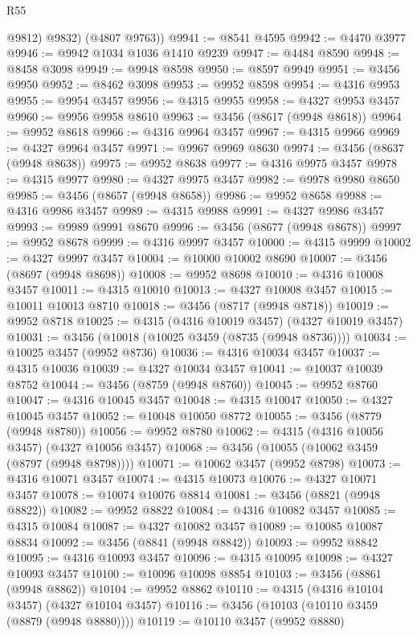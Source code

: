 \begin{lexlean}{R55}
\begin{coremodule}
          @9812)
        @9832)
      (@4807 @9763))
@9941 := @8541 @4595
@9942 := @4470 @3977
@9946 := @9942 @1034 @1036 @1410 @9239
@9947 := @4484 @8590
@9948 := @8458 @3098
@9949 := @9948 @8598
@9950 := @8597 @9949
@9951 := @3456 @9950
@9952 := @8462 @3098
@9953 := @9952 @8598
@9954 := @4316 @9953
@9955 := @9954 @3457
@9956 := @4315 @9955
@9958 := @4327 @9953 @3457
@9960 := @9956 @9958 @8610
@9963 := @3456 (@8617 (@9948 @8618))
@9964 := @9952 @8618
@9966 := @4316 @9964 @3457
@9967 := @4315 @9966
@9969 := @4327 @9964 @3457
@9971 := @9967 @9969 @8630
@9974 := @3456 (@8637 (@9948 @8638))
@9975 := @9952 @8638
@9977 := @4316 @9975 @3457
@9978 := @4315 @9977
@9980 := @4327 @9975 @3457
@9982 := @9978 @9980 @8650
@9985 := @3456 (@8657 (@9948 @8658))
@9986 := @9952 @8658
@9988 := @4316 @9986 @3457
@9989 := @4315 @9988
@9991 := @4327 @9986 @3457
@9993 := @9989 @9991 @8670
@9996 := @3456 (@8677 (@9948 @8678))
@9997 := @9952 @8678
@9999 := @4316 @9997 @3457
@10000 := @4315 @9999
@10002 := @4327 @9997 @3457
@10004 := @10000 @10002 @8690
@10007 := @3456 (@8697 (@9948 @8698))
@10008 := @9952 @8698
@10010 := @4316 @10008 @3457
@10011 := @4315 @10010
@10013 := @4327 @10008 @3457
@10015 := @10011 @10013 @8710
@10018 := @3456 (@8717 (@9948 @8718))
@10019 := @9952 @8718
@10025 := @4315 (@4316 @10019 @3457) (@4327 @10019 @3457)
@10031 := @3456 (@10018 (@10025 @3459 (@8735 (@9948 @8736))))
@10034 := @10025 @3457 (@9952 @8736)
@10036 := @4316 @10034 @3457
@10037 := @4315 @10036
@10039 := @4327 @10034 @3457
@10041 := @10037 @10039 @8752
@10044 := @3456 (@8759 (@9948 @8760))
@10045 := @9952 @8760
@10047 := @4316 @10045 @3457
@10048 := @4315 @10047
@10050 := @4327 @10045 @3457
@10052 := @10048 @10050 @8772
@10055 := @3456 (@8779 (@9948 @8780))
@10056 := @9952 @8780
@10062 := @4315 (@4316 @10056 @3457) (@4327 @10056 @3457)
@10068 := @3456 (@10055 (@10062 @3459 (@8797 (@9948 @8798))))
@10071 := @10062 @3457 (@9952 @8798)
@10073 := @4316 @10071 @3457
@10074 := @4315 @10073
@10076 := @4327 @10071 @3457
@10078 := @10074 @10076 @8814
@10081 := @3456 (@8821 (@9948 @8822))
@10082 := @9952 @8822
@10084 := @4316 @10082 @3457
@10085 := @4315 @10084
@10087 := @4327 @10082 @3457
@10089 := @10085 @10087 @8834
@10092 := @3456 (@8841 (@9948 @8842))
@10093 := @9952 @8842
@10095 := @4316 @10093 @3457
@10096 := @4315 @10095
@10098 := @4327 @10093 @3457
@10100 := @10096 @10098 @8854
@10103 := @3456 (@8861 (@9948 @8862))
@10104 := @9952 @8862
@10110 := @4315 (@4316 @10104 @3457) (@4327 @10104 @3457)
@10116 := @3456 (@10103 (@10110 @3459 (@8879 (@9948 @8880))))
@10119 := @10110 @3457 (@9952 @8880)

\end{coremodule}
\end{lexlean}
